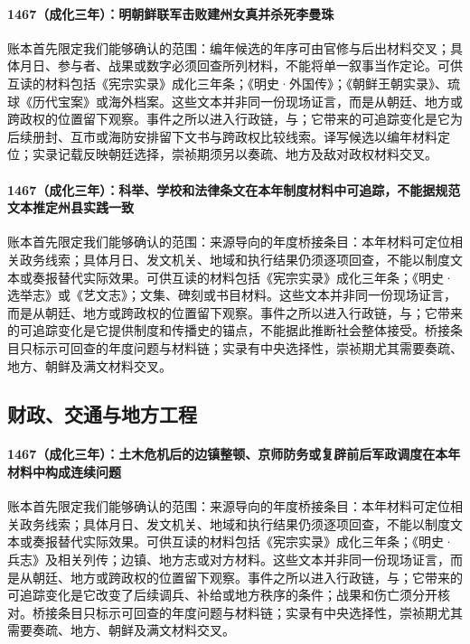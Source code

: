 \paragraph{1467（成化三年）：明朝鲜联军击败建州女真并杀死李曼珠} 账本首先限定我们能够确认的范围：编年候选的年序可由官修与后出材料交叉；具体月日、参与者、战果或数字必须回查所列材料，不能将单一叙事当作定论。可供互读的材料包括《宪宗实录》成化三年条；《明史·外国传》；《朝鲜王朝实录》、琉球《历代宝案》或海外档案。这些文本并非同一份现场证言，而是从朝廷、地方或跨政权的位置留下观察。事件之所以进入行政链，与；它带来的可追踪变化是它为后续册封、互市或海防安排留下文书与跨政权比较线索。译写候选以编年材料定位；实录记载反映朝廷选择，崇祯期须另以奏疏、地方及敌对政权材料交叉。

\paragraph{1467（成化三年）：科举、学校和法律条文在本年制度材料中可追踪，不能据规范文本推定州县实践一致} 账本首先限定我们能够确认的范围：来源导向的年度桥接条目：本年材料可定位相关政务线索；具体月日、发文机关、地域和执行结果仍须逐项回查，不能以制度文本或奏报替代实际效果。可供互读的材料包括《宪宗实录》成化三年条；《明史·选举志》或《艺文志》；文集、碑刻或书目材料。这些文本并非同一份现场证言，而是从朝廷、地方或跨政权的位置留下观察。事件之所以进入行政链，与；它带来的可追踪变化是它提供制度和传播史的锚点，不能据此推断社会整体接受。桥接条目只标示可回查的年度问题与材料链；实录有中央选择性，崇祯期尤其需要奏疏、地方、朝鲜及满文材料交叉。

\subsection{财政、交通与地方工程}

\paragraph{1467（成化三年）：土木危机后的边镇整顿、京师防务或复辟前后军政调度在本年材料中构成连续问题} 账本首先限定我们能够确认的范围：来源导向的年度桥接条目：本年材料可定位相关政务线索；具体月日、发文机关、地域和执行结果仍须逐项回查，不能以制度文本或奏报替代实际效果。可供互读的材料包括《宪宗实录》成化三年条；《明史·兵志》及相关列传；边镇、地方志或对方材料。这些文本并非同一份现场证言，而是从朝廷、地方或跨政权的位置留下观察。事件之所以进入行政链，与；它带来的可追踪变化是它改变了后续调兵、补给或地方秩序的条件；战果和伤亡须分开核对。桥接条目只标示可回查的年度问题与材料链；实录有中央选择性，崇祯期尤其需要奏疏、地方、朝鲜及满文材料交叉。

